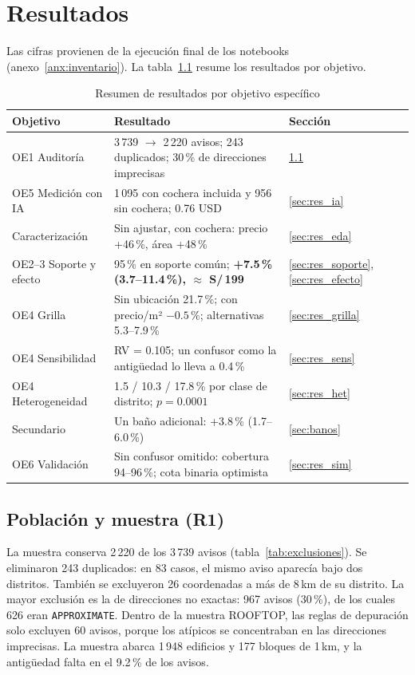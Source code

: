 \chapter{Resultados}\label{cap:resultados}

Las cifras provienen de la ejecución final de los notebooks (anexo~\ref{anx:inventario}). La tabla~\ref{tab:resumen_res} resume los resultados por objetivo.

\begin{table}[H]
\centering\small
\caption{Resumen de resultados por objetivo específico}\label{tab:resumen_res}
\begin{tabularx}{\textwidth}{>{\raggedright\arraybackslash}p{2.7cm}X>{\raggedright\arraybackslash}p{1.3cm}}
\toprule
Objetivo & Resultado & Sección \\
\midrule
OE1 Auditoría & 3\,739 $\rightarrow$ 2\,220 avisos; 243 duplicados; 30\,\% de direcciones imprecisas & \ref{sec:res_pob} \\
OE5 Medición con IA & 1\,095 con cochera incluida y 956 sin cochera; 0.76 USD & \ref{sec:res_ia} \\
Caracterización & Sin ajustar, con cochera: precio +46\,\%, área +48\,\% & \ref{sec:res_eda} \\
OE2--3 Soporte y efecto & 95\,\% en soporte común; \textbf{+7.5\,\% (3.7--11.4\,\%), $\approx$ S/\,199} & \ref{sec:res_soporte}, \ref{sec:res_efecto} \\
OE4 Grilla & Sin ubicación 21.7\,\%; con precio/m² $-0.5$\,\%; alternativas 5.3--7.9\,\% & \ref{sec:res_grilla} \\
OE4 Sensibilidad & RV = 0.105; un confusor como la antigüedad lo lleva a 0.4\,\% & \ref{sec:res_sens} \\
OE4 Heterogeneidad & 1.5 / 10.3 / 17.8\,\% por clase de distrito; $p=0.0001$ & \ref{sec:res_het} \\
Secundario & Un baño adicional: +3.8\,\% (1.7--6.0\,\%) & \ref{sec:banos} \\
OE6 Validación & Sin confusor omitido: cobertura 94--96\,\%; cota binaria optimista & \ref{sec:res_sim} \\
\bottomrule
\end{tabularx}
\end{table}

\section{Población y muestra (R1)}\label{sec:res_pob}

La muestra conserva 2\,220 de los 3\,739 avisos (tabla~\ref{tab:exclusiones}). Se eliminaron 243 duplicados: en 83 casos, el mismo aviso aparecía bajo dos distritos. También se excluyeron 26 coordenadas a más de 8\,km de su distrito. La mayor exclusión es la de direcciones no exactas: 967 avisos (30\,\%), de los cuales 626 eran \texttt{APPROXIMATE}. Dentro de la muestra ROOFTOP, las reglas de depuración solo excluyen 60 avisos, porque los atípicos se concentraban en las direcciones imprecisas. La muestra abarca 1\,948 edificios y 177 bloques de 1\,km, y la antigüedad falta en el 9.2\,\% de los avisos.

